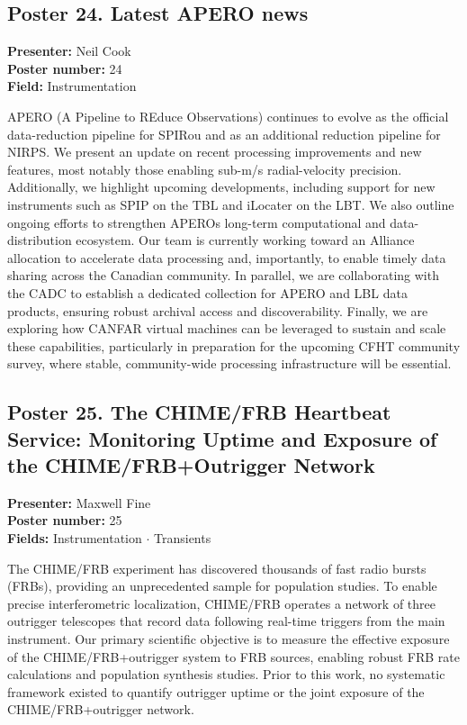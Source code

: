 \hypertarget{poster-abstract-talk-105}{}\label{poster-abstract-page-talk-105}
\subsection*{Poster 24. Latest APERO news}
\textbf{Presenter:} Neil Cook\\
\textbf{Poster number:} 24\\
\textbf{Field:} Instrumentation

APERO (A Pipeline to REduce Observations) continues to evolve as the official data-reduction pipeline for SPIRou and as an additional reduction pipeline for NIRPS. We present an update on recent processing improvements and new features, most notably those enabling sub-m/s radial-velocity precision. Additionally, we highlight upcoming developments, including support for new instruments such as SPIP on the TBL and iLocater on the LBT. We also outline ongoing efforts to strengthen APEROs long-term computational and data-distribution ecosystem. Our team is currently working toward an Alliance allocation to accelerate data processing and, importantly, to enable timely data sharing across the Canadian community. In parallel, we are collaborating with the CADC to establish a dedicated collection for APERO and LBL data products, ensuring robust archival access and discoverability. Finally, we are exploring how CANFAR virtual machines can be leveraged to sustain and scale these capabilities, particularly in preparation for the upcoming CFHT community survey, where stable, community-wide processing infrastructure will be essential.

\hypertarget{poster-abstract-talk-146}{}\label{poster-abstract-page-talk-146}
\subsection*{Poster 25. The CHIME/FRB Heartbeat Service: Monitoring Uptime and Exposure of the CHIME/FRB+Outrigger Network}
\textbf{Presenter:} Maxwell Fine\\
\textbf{Poster number:} 25\\
\textbf{Fields:} Instrumentation $\cdot$ Transients

The CHIME/FRB experiment has discovered thousands of fast radio bursts (FRBs), providing an unprecedented sample for population studies. To enable precise interferometric localization, CHIME/FRB operates a network of three outrigger telescopes that record data following real-time triggers from the main instrument. Our primary scientific objective is to measure the effective exposure of the CHIME/FRB+outrigger system to FRB sources, enabling robust FRB rate calculations and population synthesis studies. Prior to this work, no systematic framework existed to quantify outrigger uptime or the joint exposure of the CHIME/FRB+outrigger network.

